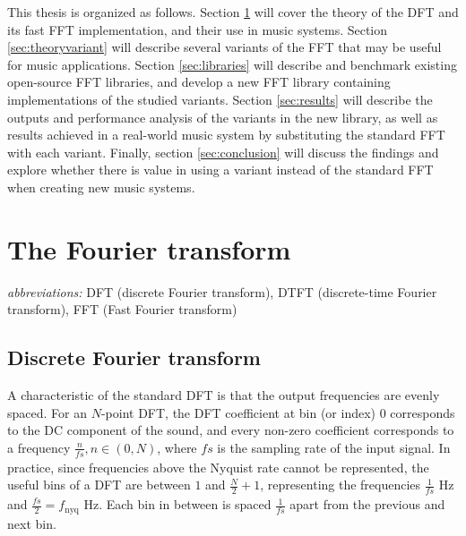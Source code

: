 \documentclass[letter,12pt,notitlepage]{article}
\begin{document}
This thesis is organized as follows. Section \ref{sec:theorystandard} will cover the theory of the DFT and its fast FFT implementation, and their use in music systems. Section \ref{sec:theoryvariant} will describe several variants of the FFT that may be useful for music applications. Section \ref{sec:libraries} will describe and benchmark existing open-source FFT libraries, and develop a new FFT library containing implementations of the studied variants. Section \ref{sec:results} will describe the outputs and performance analysis of the variants in the new library, as well as results achieved in a real-world music system by substituting the standard FFT with each variant. Finally, section \ref{sec:conclusion} will discuss the findings and explore whether there is value in using a variant instead of the standard FFT when creating new music systems.

\vfill
\clearpage

\section{The Fourier transform}
\label{sec:theorystandard}

\qquad \textit{abbreviations:} DFT (discrete Fourier transform), DTFT (discrete-time Fourier transform), FFT (Fast Fourier transform)


\subsection{Discrete Fourier transform}


A characteristic of the standard DFT is that the output frequencies are evenly spaced. For an $N$-point DFT, the DFT coefficient at bin (or index) 0 corresponds to the DC component of the sound, and every non-zero coefficient corresponds to a frequency $\frac{n}{\mathit{fs}}, n \in (0, N)$, where $\mathit{fs}$ is the sampling rate of the input signal. In practice, since frequencies above the Nyquist rate cannot be represented, the useful bins of a DFT are between $1$ and $\frac{N}{2}+1$, representing the frequencies $\frac{1}{\mathit{fs}}$ Hz and $\frac{\mathit{fs}}{2} = f_{\text{nyq}}$ Hz. Each bin in between is spaced $\frac{1}{\mathit{fs}}$ apart from the previous and next bin.

\end{document}
